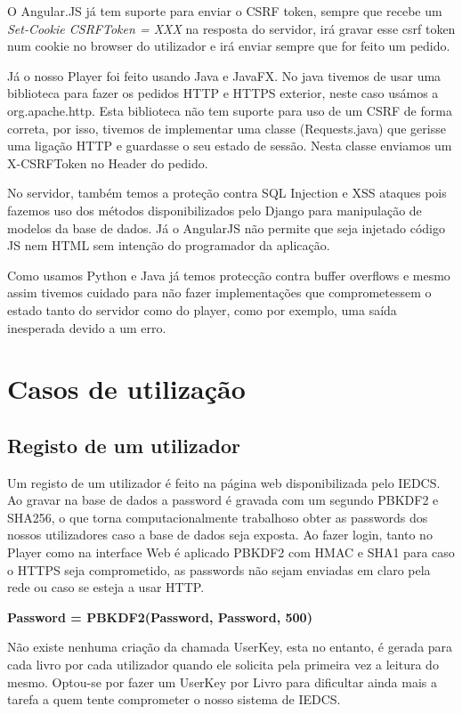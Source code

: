 \documentclass[pdftex,12pt,a4paper]{report}
\begin{document}
O Angular.JS já tem suporte para enviar o CSRF token, sempre que recebe um \textit{Set-Cookie CSRFToken = XXX} na resposta do servidor, irá gravar esse csrf token num cookie no browser do utilizador e irá enviar sempre que for feito um pedido.

Já o nosso Player foi feito usando Java e JavaFX. No java tivemos de usar uma biblioteca para fazer os pedidos HTTP e HTTPS exterior, neste caso usámos a org.apache.http. Esta biblioteca não tem suporte para uso de um CSRF de forma correta, por isso, tivemos de implementar uma classe (Requests.java) que gerisse uma ligação HTTP e guardasse o seu estado de sessão. Nesta classe enviamos um X-CSRFToken no Header do pedido.

No servidor, também temos a proteção contra SQL Injection e XSS ataques pois fazemos uso dos métodos disponibilizados pelo Django para manipulação de modelos da base de dados. Já o AngularJS não permite que seja injetado código JS nem HTML sem intenção do programador da aplicação.

Como usamos Python e Java já temos protecção contra buffer overflows e mesmo assim tivemos cuidado para não fazer implementações que comprometessem o estado tanto do servidor como do player, como por exemplo, uma saída inesperada devido a um erro.

\section{Casos de utilização}

\subsection{Registo de um utilizador}

Um registo de um utilizador é feito na página web disponibilizada pelo IEDCS. Ao gravar na base de dados a password é gravada com um segundo PBKDF2 e SHA256, o que torna computacionalmente trabalhoso obter as passwords dos nossos utilizadores caso a base de dados seja exposta. Ao fazer login, tanto no Player como na interface Web é aplicado PBKDF2 com HMAC e SHA1 para caso o HTTPS seja comprometido, as passwords não sejam enviadas em claro pela rede ou  caso se esteja a usar HTTP.

\begin{center}
	\textbf{Password = PBKDF2(Password, Password, 500)}
\end{center}

Não existe nenhuma criação da chamada UserKey, esta no entanto, é gerada para cada livro por cada utilizador quando ele solicita pela primeira vez a leitura do mesmo. Optou-se por fazer um UserKey por Livro para dificultar ainda mais a tarefa a quem tente comprometer o nosso sistema de IEDCS.
\end{document}
